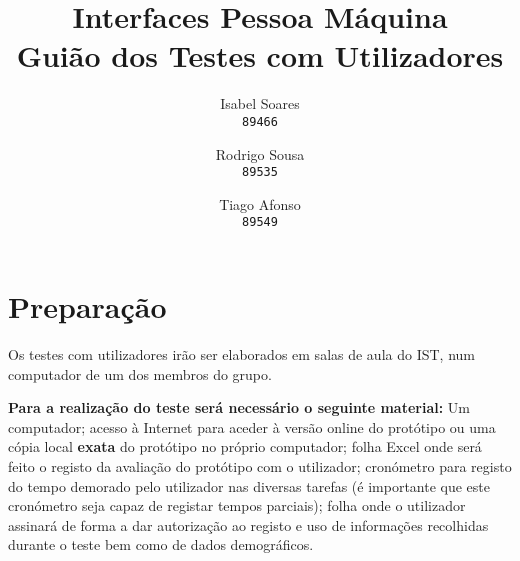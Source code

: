 \documentclass[11pt]{article}
\author{
  Isabel Soares\\
  \texttt{89466}
  \and
  Rodrigo Sousa\\
  \texttt{89535}
  \and
  Tiago Afonso\\
  \texttt{89549}
}
\title{Interfaces Pessoa Máquina\\
Guião dos Testes com Utilizadores}
\begin{document}
    

\maketitle

\section*{Preparação}
    Os testes com utilizadores irão ser elaborados em salas de aula do IST, num computador de um dos membros do grupo.
    
    \textbf{Para a realização do teste será necessário o seguinte material:}
    Um computador; acesso à Internet para aceder à versão online do protótipo ou uma cópia local \textbf{exata} do protótipo no próprio computador; folha Excel onde será feito o registo da avaliação do protótipo com o utilizador; cronómetro para registo do tempo demorado pelo utilizador nas diversas tarefas (é importante que este cronómetro seja capaz de registar tempos parciais); folha onde o utilizador assinará de forma a dar autorização ao registo e uso de informações recolhidas durante o teste bem como de dados demográficos.
\end{document}
